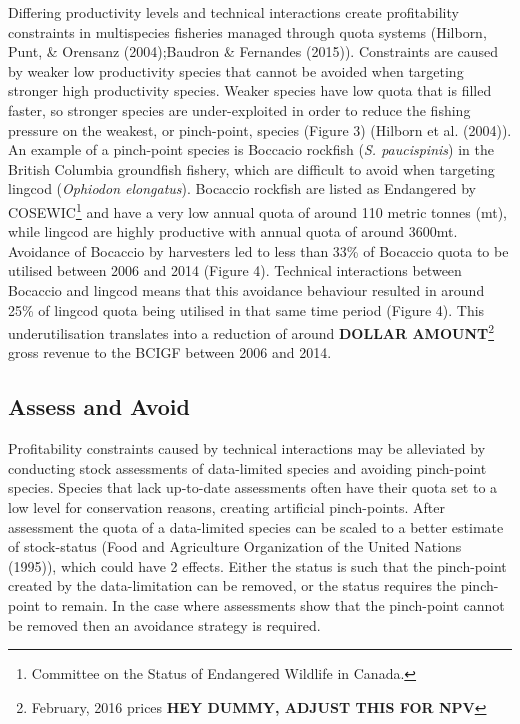 \documentclass[12pt,]{scrartcl}
\begin{document}
Differing productivity levels and technical interactions create
profitability constraints in multispecies fisheries managed through
quota systems (Hilborn, Punt, \& Orensanz (2004);Baudron \& Fernandes
(2015)). Constraints are caused by weaker low productivity species that
cannot be avoided when targeting stronger high productivity species.
Weaker species have low quota that is filled faster, so stronger species
are under-exploited in order to reduce the fishing pressure on the
weakest, or pinch-point, species (Figure 3) (Hilborn et al. (2004)). An
example of a pinch-point species is Boccacio rockfish (\emph{S.
paucispinis}) in the British Columbia groundfish fishery, which are
difficult to avoid when targeting lingcod (\emph{Ophiodon elongatus}).
Bocaccio rockfish are listed as Endangered by COSEWIC\footnote{Committee
  on the Status of Endangered Wildlife in Canada.} and have a very low
annual quota of around 110 metric tonnes (mt), while lingcod are highly
productive with annual quota of around 3600mt. Avoidance of Bocaccio by
harvesters led to less than 33\% of Bocaccio quota to be utilised
between 2006 and 2014 (Figure 4). Technical interactions between
Bocaccio and lingcod means that this avoidance behaviour resulted in
around 25\% of lingcod quota being utilised in that same time period
(Figure 4). This underutilisation translates into a reduction of around
\textbf{DOLLAR AMOUNT}\footnote{February, 2016 prices \textbf{HEY DUMMY,
  ADJUST THIS FOR NPV}} gross revenue to the BCIGF between 2006 and
2014.

\subsection{Assess and Avoid}\label{assess-and-avoid}

Profitability constraints caused by technical interactions may be
alleviated by conducting stock assessments of data-limited species and
avoiding pinch-point species. Species that lack up-to-date assessments
often have their quota set to a low level for conservation reasons,
creating artificial pinch-points. After assessment the quota of a
data-limited species can be scaled to a better estimate of stock-status
(Food and Agriculture Organization of the United Nations (1995)), which
could have 2 effects. Either the status is such that the pinch-point
created by the data-limitation can be removed, or the status requires
the pinch-point to remain. In the case where assessments show that the
pinch-point cannot be removed then an avoidance strategy is required.
\end{document}
